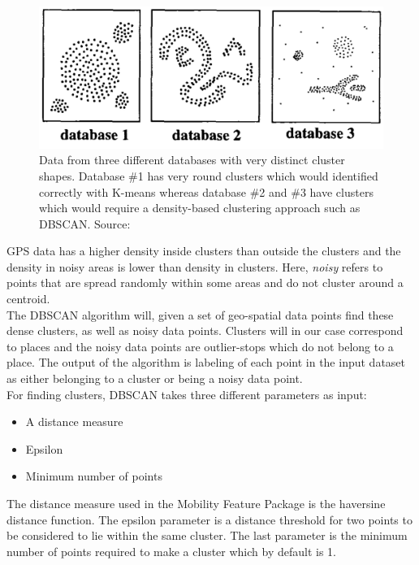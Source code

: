 \begin{figure}[h]
    \centering
    \includegraphics[width=\textwidth]{images/dbscan-clusters.png}
    \caption{Data from three different databases with very distinct cluster shapes. Database \#1 has very round clusters which would identified correctly with K-means whereas database \#2 and \#3 have clusters which would require a density-based clustering approach such as DBSCAN. Source: \cite{density-based-1996}}
    \label{fig:dbscan_shapes}
\end{figure}

GPS data has a higher density inside clusters than outside the clusters and the density in noisy areas is lower than density in clusters. Here, \textit{noisy} refers to points that are spread randomly within some areas and do not cluster around a centroid.\\

The DBSCAN algorithm will, given a set of geo-spatial data points find these dense clusters, as well as noisy data points. Clusters will in our case correspond to places and the noisy data points are outlier-stops which do not belong to a place. The output of the algorithm is labeling of each point in the input dataset as either belonging to a cluster or being a noisy data point.\\

For finding clusters, DBSCAN takes three different parameters as input:

\begin{itemize}
    \item A distance measure
    \item Epsilon
    \item Minimum number of points
\end{itemize}

The distance measure used in the Mobility Feature Package is the haversine distance function. The epsilon parameter is a distance threshold for two points to be considered to lie within the same cluster. The last parameter is the minimum number of points required to make a cluster which by default is 1. 


